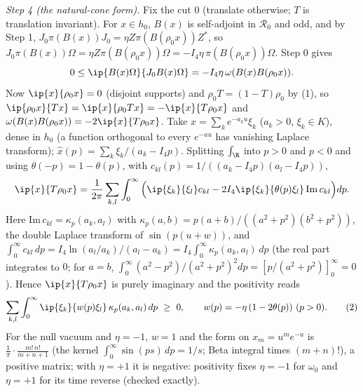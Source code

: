 \emph{Step 4 (the natural-cone form).} Fix the cut $0$ (translate otherwise; $T$ is translation invariant). For $x \in h_{0}$, $B(x)$ is self-adjoint in $\mathcal{R}_{0}$ and odd, and by Step 1, $J_{0}\pi(B(x))J_{0} = \eta Z\pi(B(\rho_{0}x))Z^{*}$, so $J_{0}\pi(B(x))\Omega = \eta Z\pi(B(\rho_{0}x))\Omega = -I_{4}\eta\,\pi(B(\rho_{0}x))\Omega$. Step 0 gives
\[ 0 \le \ip{B(x)\Omega}{J_{0}B(x)\Omega} = -I_{4}\eta\,\omega(B(x)B(\rho_{0}x)). \]
Now $\ip{x}{\rho_{0}x} = 0$ (disjoint supports) and $\rho_{0}T = (1 - T)\rho_{0}$ by (1), so $\ip{\rho_{0}x}{Tx} = \ip{x}{\rho_{0}Tx} = -\ip{x}{T\rho_{0}x}$ and $\omega(B(x)B(\rho_{0}x)) = -2\ip{x}{T\rho_{0}x}$. Take $x = \sum_{k}e^{-a_{k}u}\xi_{k}$ ($a_{k} > 0$, $\xi_{k} \in K$), dense in $h_{0}$ (a function orthogonal to every $e^{-au}$ has vanishing Laplace transform); $\hat x(p) = \sum_{k}\xi_{k}/(a_{k} - I_{4}p)$. Splitting $\int_{\R}$ into $p > 0$ and $p < 0$ and using $\theta(-p) = 1 - \theta(p)$, with $c_{kl}(p) = 1/((a_{k} - I_{4}p)(a_{l} - I_{4}p))$,
\[ \ip{x}{T\rho_{0}x} = \frac{1}{2\pi}\sum_{k, l}\int_{0}^{\infty}\Big(\ip{\xi_{k}}{\xi_{l}}c_{kl} - 2I_{4}\ip{\xi_{k}}{\theta(p)\xi_{l}}\,\mathrm{Im}\,c_{kl}\Big)dp. \]
Here $\mathrm{Im}\,c_{kl} = \kappa_{p}(a_{k}, a_{l})$ with $\kappa_{p}(a, b) = p(a + b)/((a^{2} + p^{2})(b^{2} + p^{2}))$, the double Laplace transform of $\sin(p(u + w))$, and $\int_{0}^{\infty}c_{kl}\,dp = I_{4}\ln(a_{l}/a_{k})/(a_{l} - a_{k}) = I_{4}\int_{0}^{\infty}\kappa_{p}(a_{k}, a_{l})\,dp$ (the real part integrates to $0$; for $a = b$, $\int_{0}^{\infty}(a^{2} - p^{2})/(a^{2} + p^{2})^{2}dp = [p/(a^{2} + p^{2})]_{0}^{\infty} = 0$). Hence $\ip{x}{T\rho_{0}x}$ is purely imaginary and the positivity reads
\[ \sum_{k, l}\int_{0}^{\infty}\ip{\xi_{k}}{w(p)\xi_{l}}\,\kappa_{p}(a_{k}, a_{l})\,dp \ \ge\ 0, \qquad w(p) = -\eta\,(1 - 2\theta(p))\ (p > 0). \tag{2} \]
For the null vacuum and $\eta = -1$, $w = 1$ and the form on $x_{m} = u^{m}e^{-u}$ is $\tfrac{1}{\pi}\cdot\tfrac{m!\,n!}{m + n + 1}$ (the kernel $\int_{0}^{\infty}\sin(ps)\,dp = 1/s$; Beta integral times $(m + n)!$), a positive matrix; with $\eta = +1$ it is negative: positivity fixes $\eta = -1$ for $\omega_{0}$ and $\eta = +1$ for its time reverse (checked exactly).

